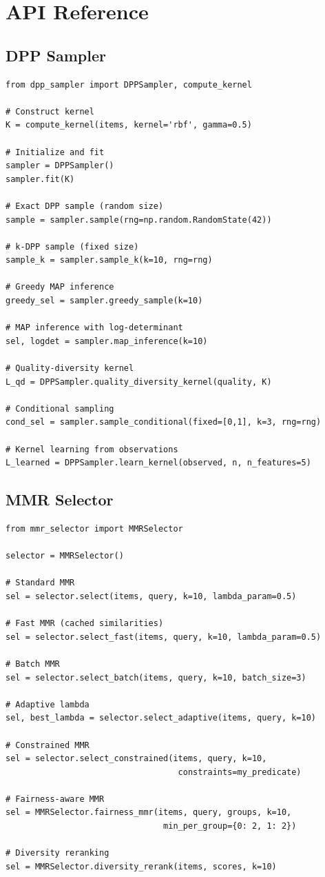 \documentclass[11pt]{article}
\begin{document}
\section{API Reference}
\label{app:api}

\subsection{DPP Sampler}

\begin{verbatim}
from dpp_sampler import DPPSampler, compute_kernel

# Construct kernel
K = compute_kernel(items, kernel='rbf', gamma=0.5)

# Initialize and fit
sampler = DPPSampler()
sampler.fit(K)

# Exact DPP sample (random size)
sample = sampler.sample(rng=np.random.RandomState(42))

# k-DPP sample (fixed size)
sample_k = sampler.sample_k(k=10, rng=rng)

# Greedy MAP inference
greedy_sel = sampler.greedy_sample(k=10)

# MAP inference with log-determinant
sel, logdet = sampler.map_inference(k=10)

# Quality-diversity kernel
L_qd = DPPSampler.quality_diversity_kernel(quality, K)

# Conditional sampling
cond_sel = sampler.sample_conditional(fixed=[0,1], k=3, rng=rng)

# Kernel learning from observations
L_learned = DPPSampler.learn_kernel(observed, n, n_features=5)
\end{verbatim}

\subsection{MMR Selector}

\begin{verbatim}
from mmr_selector import MMRSelector

selector = MMRSelector()

# Standard MMR
sel = selector.select(items, query, k=10, lambda_param=0.5)

# Fast MMR (cached similarities)
sel = selector.select_fast(items, query, k=10, lambda_param=0.5)

# Batch MMR
sel = selector.select_batch(items, query, k=10, batch_size=3)

# Adaptive lambda
sel, best_lambda = selector.select_adaptive(items, query, k=10)

# Constrained MMR
sel = selector.select_constrained(items, query, k=10,
                                   constraints=my_predicate)

# Fairness-aware MMR
sel = MMRSelector.fairness_mmr(items, query, groups, k=10,
                                min_per_group={0: 2, 1: 2})

# Diversity reranking
sel = MMRSelector.diversity_rerank(items, scores, k=10)
\end{verbatim}
\end{document}

